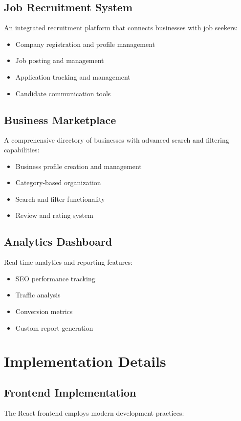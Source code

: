 \documentclass[11pt,a4paper]{article}
\begin{document}
\subsection{Job Recruitment System}
An integrated recruitment platform that connects businesses with job seekers:

\begin{itemize}
    \item Company registration and profile management
    \item Job posting and management
    \item Application tracking and management
    \item Candidate communication tools
\end{itemize}

\subsection{Business Marketplace}
A comprehensive directory of businesses with advanced search and filtering capabilities:

\begin{itemize}
    \item Business profile creation and management
    \item Category-based organization
    \item Search and filter functionality
    \item Review and rating system
\end{itemize}

\subsection{Analytics Dashboard}
Real-time analytics and reporting features:

\begin{itemize}
    \item SEO performance tracking
    \item Traffic analysis
    \item Conversion metrics
    \item Custom report generation
\end{itemize}

\section{Implementation Details}
\label{sec:implementation}

\subsection{Frontend Implementation}
The React frontend employs modern development practices:
\end{document}
